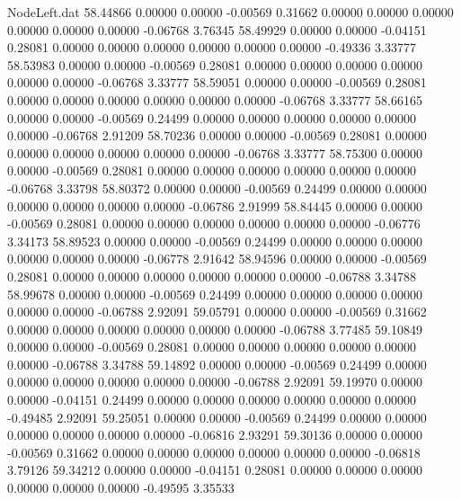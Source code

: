 \begin{filecontents}{NodeLeft.dat}
  58.44866    0.00000    0.00000    -0.00569    0.31662    0.00000    0.00000    0.00000    0.00000    0.00000    0.00000   -0.06768    3.76345
  58.49929    0.00000    0.00000    -0.04151    0.28081    0.00000    0.00000    0.00000    0.00000    0.00000    0.00000   -0.49336    3.33777
  58.53983    0.00000    0.00000    -0.00569    0.28081    0.00000    0.00000    0.00000    0.00000    0.00000    0.00000   -0.06768    3.33777
  58.59051    0.00000    0.00000    -0.00569    0.28081    0.00000    0.00000    0.00000    0.00000    0.00000    0.00000   -0.06768    3.33777
  58.66165    0.00000    0.00000    -0.00569    0.24499    0.00000    0.00000    0.00000    0.00000    0.00000    0.00000   -0.06768    2.91209
  58.70236    0.00000    0.00000    -0.00569    0.28081    0.00000    0.00000    0.00000    0.00000    0.00000    0.00000   -0.06768    3.33777
  58.75300    0.00000    0.00000    -0.00569    0.28081    0.00000    0.00000    0.00000    0.00000    0.00000    0.00000   -0.06768    3.33798
  58.80372    0.00000    0.00000    -0.00569    0.24499    0.00000    0.00000    0.00000    0.00000    0.00000    0.00000   -0.06786    2.91999
  58.84445    0.00000    0.00000    -0.00569    0.28081    0.00000    0.00000    0.00000    0.00000    0.00000    0.00000   -0.06776    3.34173
  58.89523    0.00000    0.00000    -0.00569    0.24499    0.00000    0.00000    0.00000    0.00000    0.00000    0.00000   -0.06778    2.91642
  58.94596    0.00000    0.00000    -0.00569    0.28081    0.00000    0.00000    0.00000    0.00000    0.00000    0.00000   -0.06788    3.34788
  58.99678    0.00000    0.00000    -0.00569    0.24499    0.00000    0.00000    0.00000    0.00000    0.00000    0.00000   -0.06788    2.92091
  59.05791    0.00000    0.00000    -0.00569    0.31662    0.00000    0.00000    0.00000    0.00000    0.00000    0.00000   -0.06788    3.77485
  59.10849    0.00000    0.00000    -0.00569    0.28081    0.00000    0.00000    0.00000    0.00000    0.00000    0.00000   -0.06788    3.34788
  59.14892    0.00000    0.00000    -0.00569    0.24499    0.00000    0.00000    0.00000    0.00000    0.00000    0.00000   -0.06788    2.92091
  59.19970    0.00000    0.00000    -0.04151    0.24499    0.00000    0.00000    0.00000    0.00000    0.00000    0.00000   -0.49485    2.92091
  59.25051    0.00000    0.00000    -0.00569    0.24499    0.00000    0.00000    0.00000    0.00000    0.00000    0.00000   -0.06816    2.93291
  59.30136    0.00000    0.00000    -0.00569    0.31662    0.00000    0.00000    0.00000    0.00000    0.00000    0.00000   -0.06818    3.79126
  59.34212    0.00000    0.00000    -0.04151    0.28081    0.00000    0.00000    0.00000    0.00000    0.00000    0.00000   -0.49595    3.35533

\end{filecontents}
